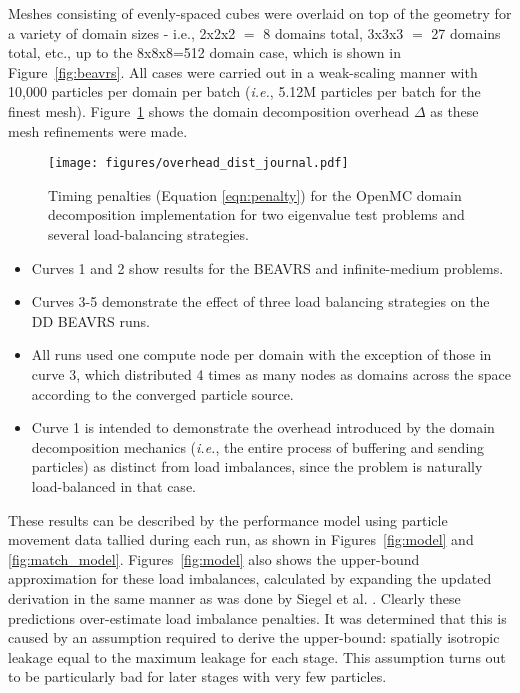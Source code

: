 \documentclass[12pt,twoside]{mitthesis-exec}
\begin{document}
Meshes consisting of evenly-spaced cubes were overlaid on top of the geometry
for a variety of domain sizes - i.e., 2x2x2 $=$ 8 domains total, 3x3x3 $=$ 27
domains total, etc., up to the 8x8x8=512 domain case, which is shown in
Figure~\ref{fig:beavrs}. All cases were carried out in a weak-scaling manner
with 10,000 particles per domain per batch (\emph{i.e.}, 5.12M particles per
batch for the finest mesh). Figure~\ref{fig:imbal_removed} shows the domain
decomposition overhead $\Delta$ as these mesh refinements were made.

\newpage

\begin{figure}[ht]
    \centering
    \texttt{[image: figures/overhead\_dist\_journal.pdf]}
    \caption[Load balancing results for BEAVRS]{Timing penalties (Equation
    \ref{eqn:penalty}) for the OpenMC domain decomposition implementation for
    two eigenvalue test problems and several load-balancing
    strategies.\label{fig:imbal_removed}}
\end{figure}

\begin{itemize}
  \item Curves 1 and 2 show results for the BEAVRS and infinite-medium problems.
  \item Curves 3-5 demonstrate the effect of three
  load balancing strategies on the DD BEAVRS runs.
  \item All runs used one compute node per domain with the exception of those in
  curve 3, which distributed 4 times as many nodes as domains across the space
  according to the converged particle source.
  \item Curve 1 is intended to demonstrate the overhead introduced by the domain
  decomposition mechanics (\emph{i.e.}, the entire process of buffering and
  sending particles) as distinct from load imbalances, since the problem is
  naturally load-balanced in that case.
\end{itemize}

These results can be described by the performance model using particle movement
data tallied during each run, as shown in Figures~\ref{fig:model} and
\ref{fig:match_model}. Figures~\ref{fig:model} also shows the upper-bound
approximation for these load imbalances, calculated by expanding the updated
derivation in the same manner as was done by Siegel et al. \cite{Siegel2}.
Clearly these predictions over-estimate load imbalance
penalties. It was determined that this is caused by an assumption required to
derive the upper-bound: spatially isotropic leakage equal to the maximum leakage
for each stage. This assumption turns out to be particularly bad for later
stages with very few particles.
\end{document}
